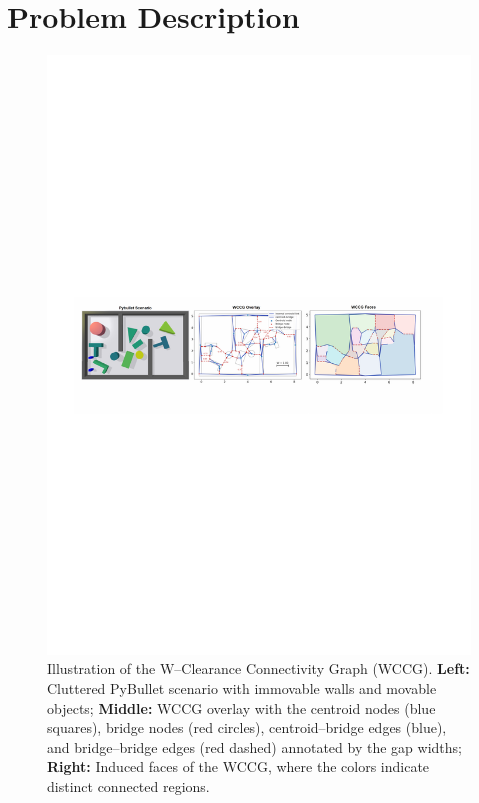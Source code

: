 \section{Problem Description}\label{sec:problem}
\begin{figure}[t!]
  \centering
  \includegraphics[width=0.95\linewidth]{figures/wccg.pdf}
  \vspace{-0.1in}
  \caption{Illustration of the W--Clearance Connectivity Graph (WCCG).
\textbf{Left:} Cluttered PyBullet scenario with immovable walls and movable objects;
\textbf{Middle:} WCCG overlay with the centroid nodes (blue squares), bridge nodes
(red circles), centroid--bridge edges (blue), and bridge--bridge edges (red dashed)
annotated by the gap widths;
\textbf{Right:} Induced faces of the WCCG, where the colors indicate distinct connected
regions.}
  \label{fig:wccg}
  \vspace{-0.2in}
\end{figure}
